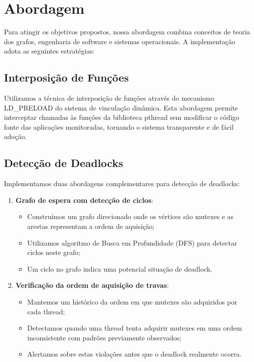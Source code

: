 \section{Abordagem}\label{sec:abordagem}

Para atingir os objetivos propostos, nossa abordagem combina conceitos de teoria dos grafos, engenharia de software e sistemas operacionais. A implementação adota as seguintes estratégias:

\subsection{Interposição de Funções}

Utilizamos a técnica de interposição de funções através do mecanismo LD\_PRELOAD do sistema de vinculação dinâmica. Esta abordagem permite interceptar chamadas às funções da biblioteca pthread sem modificar o código fonte das aplicações monitoradas, tornando o sistema transparente e de fácil adoção.

\subsection{Detecção de Deadlocks}

Implementamos duas abordagens complementares para detecção de deadlocks:

\begin{enumerate}
    \item \textbf{Grafo de espera com detecção de ciclos}:
    \begin{itemize}
        \item Construímos um grafo direcionado onde os vértices são mutexes e as arestas representam a ordem de aquisição;
        \item Utilizamos algoritmo de Busca em Profundidade (DFS) para detectar ciclos neste grafo;
        \item Um ciclo no grafo indica uma potencial situação de deadlock.
    \end{itemize}

    \item \textbf{Verificação da ordem de aquisição de travas}:
    \begin{itemize}
        \item Mantemos um histórico da ordem em que mutexes são adquiridos por cada thread;
        \item Detectamos quando uma thread tenta adquirir mutexes em uma ordem inconsistente com padrões previamente observados;
        \item Alertamos sobre estas violações antes que o deadlock realmente ocorra.
    \end{itemize}
\end{enumerate}

